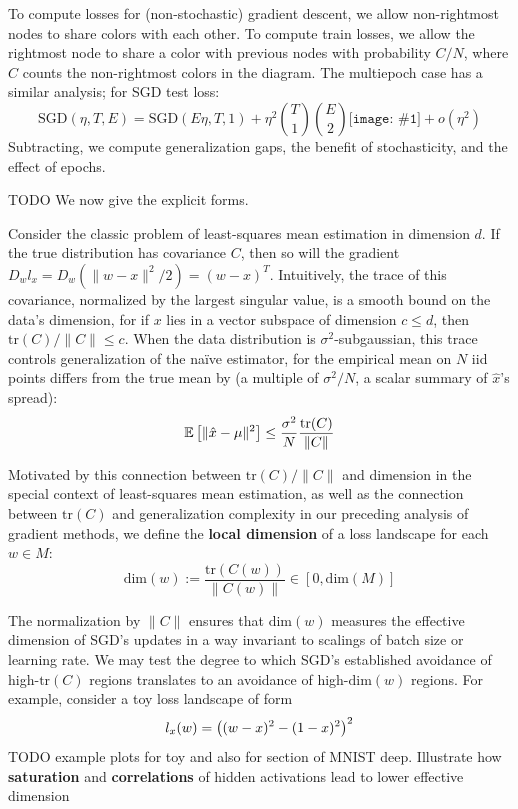 \documentclass[12pt]{article}
\newcommand{\dia}[1]{\texttt{[image: \#1]}}
\begin{document}
            To compute losses for (non-stochastic) gradient descent, we allow non-rightmost nodes to share colors with
            each other.
            To compute train losses, we allow the rightmost node to share a color with previous nodes with probability
            $C/N$, where $C$ counts the non-rightmost colors in the diagram. 
            The multiepoch case has a similar analysis; for SGD test loss:
            $$
                \text{SGD}(\eta, T, E) = \text{SGD}(E\eta, T, 1) + \eta^2 {T \choose 1} {E \choose 2} \dia{new-rrg} + o(\eta^2)  
            $$
            Subtracting, we compute generalization gaps, the benefit of stochasticity, and the effect of epochs.

            {\color{red} TODO We now give the explicit forms.}


            Consider the classic problem of least-squares mean estimation in dimension $d$.  If the true distribution
            has covariance $C$, then so will the gradient $D_w l_x = D_w(\|w-x\|^2/2) = (w-x)^T$.  Intuitively, the
            trace of this covariance, normalized by the largest singular value, is a smooth bound on the data's
            dimension, for if $x$ lies in a vector subspace of dimension $c\leq d$, then $\text{tr}(C) / \|C\| \leq c$.
            When the data distribution is $\sigma^2$-subgaussian, this trace controls generalization of the na\"ive
            estimator, for the empirical mean on $N$ iid points differs from the true mean
            by (a multiple of $\sigma^2/N$, a scalar summary of $\hat x$'s spread):
            $$
                \mathbb{E}\left[ \|\hat x - \mu\|^2 \right] \leq \frac{\sigma^2}{N} \frac{\text{tr}(C)}{\|C\|}
            $$

            Motivated by this connection between $\text{tr}(C)/\|C\|$ and dimension in the special context of least-squares
            mean estimation, as well as the connection between $\text{tr}(C)$ and generalization complexity in our preceding 
            analysis of gradient methods, we define the {\bf local dimension} of a loss landscape for each
            $w\in M$:
            $$
                \text{dim}(w) := \frac{\text{tr}(C(w))}{\|C(w)\|} \in [0, \text{dim}(M)]
            $$

            The normalization by $\|C\|$ ensures that $\text{dim}(w)$ measures the effective dimension of SGD's 
            updates in a way invariant to scalings of batch size or learning rate.  We may test the degree to which
            SGD's established avoidance of high-$\text{tr}(C)$ regions translates to an avoidance of
            high-$\text{dim}(w)$ regions.  For example, consider a toy loss landscape of form
            $$
                l_x(w) = \left( (w - x)^2 - (1-x)^2 \right)^2 
            $$
            {\color{red} TODO example plots for toy and also for section of MNIST deep.
             Illustrate how {\bf saturation} and {\bf correlations} of hidden activations lead to lower effective dimension} 
\end{document}
